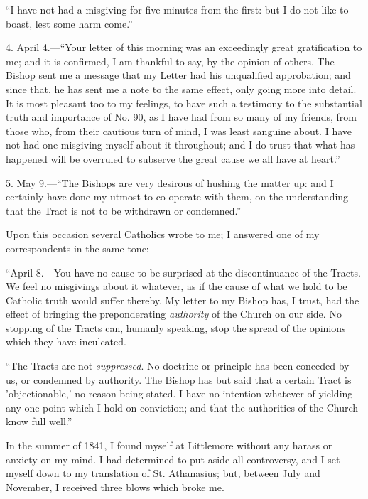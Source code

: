 ``I have not had a misgiving for five minutes from the first: but
I do not like to boast, lest some harm come.''

4. April 4.—``Your letter of this morning was an exceedingly
great gratification to me; and it is confirmed, I am thankful to say, by
the opinion of others. The Bishop sent me a message that my Letter
had his unqualified approbation; and since that, he has sent me a note
to the same effect, only going more into detail. It is most pleasant too
to my feelings, to have such a testimony to the substantial truth and
importance of No. 90, as I have had from so many of my friends, from
those who, from their cautious turn of mind, I was least sanguine about.
I have not had one misgiving myself about it throughout; and I do trust
that what has happened will be overruled to subserve the great cause we
all have at heart.''

5. May 9.—``The Bishops are very desirous of
hushing the matter up: and I certainly have done my utmost to co-operate
with them, on the understanding that the Tract is not to be withdrawn or
condemned.''

Upon this occasion several Catholics wrote to
me; I answered one of my correspondents in the same tone:—

``April 8.—You have no cause to be surprised at the
discontinuance of the Tracts. We feel no misgivings about it whatever,
as if the cause of what we hold to be Catholic truth would suffer
thereby. My letter to my Bishop has, I trust, had the effect of bringing
the preponderating \emph{authority} of the Church on our side. No
stopping of the Tracts can, humanly speaking, stop the spread of the
opinions which they have inculcated.

``The Tracts are not \emph{suppressed}. No doctrine or principle
has been conceded by us, or condemned by authority. The Bishop has but
said that a certain Tract is 'objectionable,' no reason being
stated. I have no intention whatever of yielding any one point which I
hold on conviction; and that the authorities of the Church know full
well.''

In the summer of 1841, I found myself at Littlemore without any
harass or anxiety on my mind. I had determined to put aside all
controversy, and I set myself down to my translation of St. Athanasius;
but, between July and November, I received three blows which broke me.

